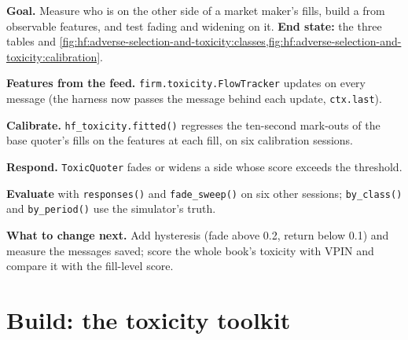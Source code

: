 \begin{tutorial}
\textbf{Goal.} Measure who is on the other side of a market maker's fills, build a  from observable features, and test fading and
widening on it. \textbf{End state:} the three tables and \cref{fig:hf:adverse-selection-and-toxicity:classes,fig:hf:adverse-selection-and-toxicity:calibration}.
\begin{tutsteps}
\item \textbf{Features from the feed.} \texttt{firm.toxicity.FlowTracker} updates on every message (the harness now passes the message behind each
update, \texttt{ctx.last}).
\label{lst:hf:adverse-selection-and-toxicity:features}
\item \textbf{Calibrate.} \texttt{hf\_toxicity.fitted()} regresses the ten-second mark-outs of the base quoter's fills on the features at each
fill, on six calibration sessions.
\item \textbf{Respond.} \texttt{ToxicQuoter} fades or widens a side whose score exceeds the threshold.
\label{lst:hf:adverse-selection-and-toxicity:quoter}
\item \textbf{Evaluate} with \texttt{responses()} and \texttt{fade\_sweep()} on six other sessions; \texttt{by\_class()} and \texttt{by\_period()} use
the simulator's truth.
\end{tutsteps}
\textbf{What to change next.} Add hysteresis (fade above 0.2, return below 0.1) and measure the messages saved; score the whole book's toxicity
with VPIN and compare it with the fill-level score.
\end{tutorial}

\section{Build: the toxicity toolkit}\label{bld:hf:adverse-selection-and-toxicity:toxicity}

